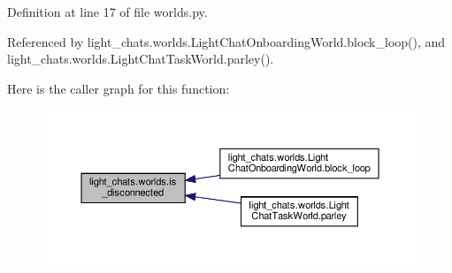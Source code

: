 Definition at line 17 of file worlds.\+py.



Referenced by light\+\_\+chats.\+worlds.\+Light\+Chat\+Onboarding\+World.\+block\+\_\+loop(), and light\+\_\+chats.\+worlds.\+Light\+Chat\+Task\+World.\+parley().

Here is the caller graph for this function\+:
\nopagebreak
\begin{figure}[H]
\begin{center}
\leavevmode
\includegraphics[width=350pt]{namespacelight__chats_1_1worlds_a43b0aff73307cda95a089763b77f40d3_icgraph}
\end{center}
\end{figure}
